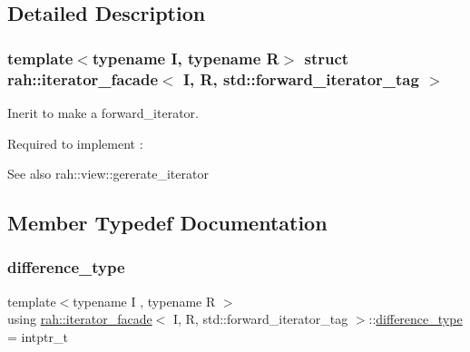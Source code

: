 \subsection{Detailed Description}
\subsubsection*{template$<$typename I, typename R$>$\newline
struct rah\+::iterator\+\_\+facade$<$ I, R, std\+::forward\+\_\+iterator\+\_\+tag $>$}

Inerit to make a forward\+\_\+iterator. 

Required to implement \+: 
\begin{DoxyCode}{0}
\end{DoxyCode}
 \begin{DoxySeeAlso}{See also}
rah\+::view\+::gererate\+\_\+iterator 
\end{DoxySeeAlso}


\subsection{Member Typedef Documentation}
\mbox{\label{structrah_1_1iterator__facade_3_01_i_00_01_r_00_01std_1_1forward__iterator__tag_01_4_a9f8ec957ea36b46eae3ca8bb89b6cf1c}} 
\subsubsection{\texorpdfstring{difference\_type}{difference\_type}}
{\footnotesize\ttfamily template$<$typename I , typename R $>$ \\
using \mbox{\hyperlink{structrah_1_1iterator__facade}{rah\+::iterator\+\_\+facade}}$<$ I, R, std\+::forward\+\_\+iterator\+\_\+tag $>$\+::\mbox{\hyperlink{structrah_1_1iterator__facade_3_01_i_00_01_r_00_01std_1_1forward__iterator__tag_01_4_a9f8ec957ea36b46eae3ca8bb89b6cf1c}{difference\+\_\+type}} =  intptr\+\_\+t}

